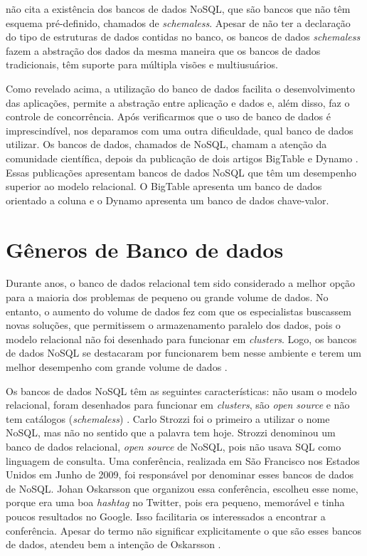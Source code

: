  não cita a existência dos bancos de dados NoSQL, que são bancos que não têm esquema pré-definido, chamados de \textit{schemaless}. Apesar de não ter a declaração do tipo de estruturas de dados contidas no banco, os bancos de dados \textit{schemaless} fazem a abstração dos dados da mesma maneira que os bancos de dados tradicionais, têm suporte para múltipla visões e multiusuários.

Como revelado acima, a utilização do banco de dados facilita o desenvolvimento das aplicações, permite a abstração entre aplicação e dados e, além disso, faz o controle de concorrência. Após verificarmos que o uso de banco de dados é imprescindível, nos deparamos com uma outra dificuldade, qual banco de dados utilizar. Os bancos de dados, chamados de NoSQL, chamam a atenção da comunidade científica, depois da publicação de dois artigos BigTable \cite{bigtable} e Dynamo \cite{dynamo}. Essas publicações apresentam bancos de dados NoSQL que têm um desempenho superior ao modelo relacional. O BigTable apresenta um banco de dados orientado a coluna e o Dynamo apresenta um banco de dados chave-valor.

\section{Gêneros de Banco de dados}
\label{sec:databasetype}
Durante anos, o banco de dados relacional tem sido considerado a melhor opção para a maioria dos problemas de pequeno ou grande volume de dados. No entanto, o aumento do volume de dados fez com que os especialistas buscassem novas soluções, que permitissem o armazenamento paralelo dos dados, pois o modelo relacional não foi desenhado para funcionar em \textit{clusters}. Logo, os bancos de dados NoSQL se destacaram por funcionarem bem nesse ambiente e terem um melhor desempenho com grande volume de dados \cite{NoSQL}.

Os bancos de dados NoSQL têm as seguintes características: não usam o modelo relacional, foram desenhados para funcionar em \textit{clusters}, são \textit{open source} e não tem catálogos (\textit{schemaless}) \cite{NoSQL}. Carlo Strozzi foi o primeiro a utilizar o nome NoSQL, mas não no sentido que a palavra tem hoje. Strozzi denominou um banco de dados relacional, \textit{open source} de NoSQL, pois não usava \ac{SQL} como linguagem de consulta. Uma conferência, realizada em São Francisco nos Estados Unidos em Junho de 2009, foi responsável por denominar esses bancos de dados de NoSQL. Johan Oskarsson que organizou essa conferência, escolheu esse nome, porque era uma boa \textit{hashtag} no Twitter, pois era pequeno, memorável e tinha poucos resultados no Google. Isso facilitaria os interessados a encontrar a conferência. Apesar do termo não significar explicitamente o que são esses bancos de dados, atendeu bem a intenção de Oskarsson \cite{NoSQL}.


